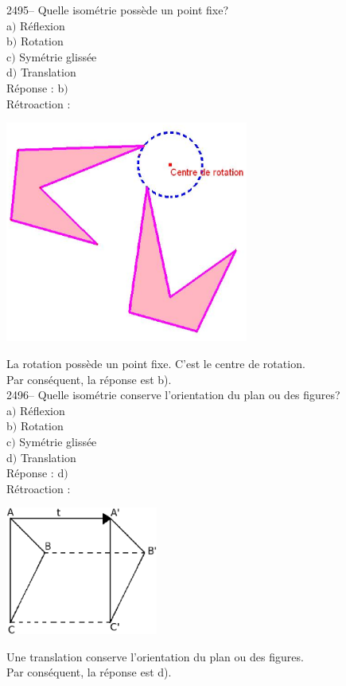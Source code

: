 \documentclass[letterpaper, 12pt]{article}
\begin{document}
2495-- Quelle isom\'etrie poss\`ede un point fixe?\\

a$)$  R\'eflexion \\
b$)$  Rotation\\
c$)$  Sym\'etrie gliss\'ee\\
d$)$  Translation \\

R\'eponse : b$)$ \\

R\'etroaction :\\
\begin{center}
 \includegraphics[width=8cm,bb=14 14 469 315]{Q2495.eps}
\end{center}
La rotation poss\`ede un point fixe. C'est le centre de rotation. \\
Par cons\'equent, la r\'eponse est b).\\

2496--  Quelle isom\'etrie conserve l'orientation du plan ou des figures?\\

a$)$  R\'eflexion \\
b$)$  Rotation\\
c$)$  Sym\'etrie gliss\'ee\\
d$)$  Translation \\

R\'eponse : d$)$ \\

R\'etroaction :\\
\begin{center}
 \includegraphics[width=5cm,bb=14 14 634 582]{Q2496.eps}
\end{center}
Une translation conserve l'orientation du plan ou des figures.\\
Par cons\'equent, la r\'eponse est d).\\
\end{document}
